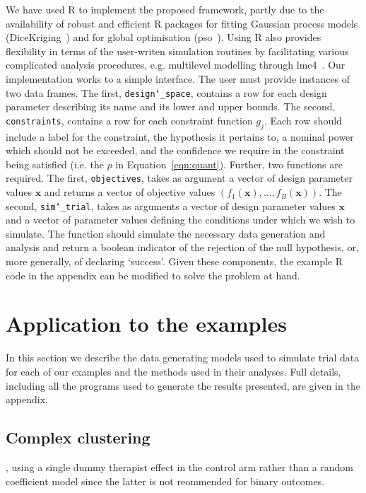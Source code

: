 \documentclass[]{sagej}
\begin{document}
We have used R to implement the proposed framework, partly due to the availability of robust and efficient R packages for fitting Gaussian process models (DiceKriging~\cite{Roustant2012}) and for global optimisation (pso~\cite{Bendtsen2012}). Using R also provides flexibility in terms of the user-writen simulation routines by facilitating various complicated analysis procedures, e.g. multilevel modelling through lme4~\cite{Bates2015}. Our implementation works to a simple interface. The user must provide instances of two data frames. The first, \texttt{design\char`_space}, contains a row for each design parameter describing its name and its lower and upper bounds. The second, \texttt{constraints}, contains a row for each constraint function $g_{j}$. Each row should include a label for the constraint, the hypothesis it pertains to, a nominal power which should not be exceeded, and the confidence we require in the constraint being satisfied (i.e. the $p$ in Equation~\ref{eqn:quant}). Further, two functions are required. The first, \texttt{objectives}, takes as argument a vector of design parameter values $\mathbf{x}$ and returns a vector of objective values $( f_{1}(\mathbf{x}), \ldots, f_{B}(\mathbf{x}) )$. The second, \texttt{sim\char`_trial}, takes as arguments a vector of design parameter values $\mathbf{x}$ and a vector of parameter values defining the conditions under which we wish to simulate. The function should simulate the necessary data generation and analysis and return a boolean indicator of the rejection of the null hypothesis, or, more generally, of declaring `success'. Given these components, the example R code in the appendix can be modified to solve the problem at hand.

\section{Application to the examples}\label{sec:application}

In this section we describe the data generating models used to simulate trial data for each of our examples and the methods used in their analyses. Full details, including all the programs used to generate the results presented, are given in the appendix.

\subsection{Complex clustering}

, using a single dummy therapist effect in the control arm rather than a random coefficient model since the latter is not reommended for binary outcomes\cite{Roberts2015}. 
\end{document}
